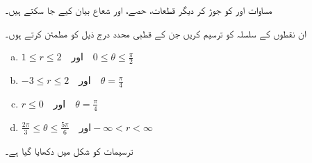 مساوات  اور  کو جوڑ کر دیگر قطعات، حصے،  اور شعاع بیان کیے جا سکتے ہیں۔

ان نقطوں کے سلسلہ کو ترسیم کریں جن کے قطبی محدد درج ذیل کو مطمئن کرتے ہوں۔ 
\begin{enumerate}[a.]
\item
$1\le r\le 2\quad \text{اور}\quad  0\le \theta\le \frac{\pi}{2}$
\item
$-3\le r\le 2\quad \text{اور}\quad  \theta=\frac{\pi}{4}$
\item
$r\le  0\quad \text{اور}\quad  \theta=\frac{\pi}{4}$
\item
$\frac{2\pi}{3}\le \theta\le \frac{5\pi}{6}\quad \text{اور} -\infty<r<\infty$
\end{enumerate}

ترسیمات کو شکل  میں دکھایا گیا ہے۔
